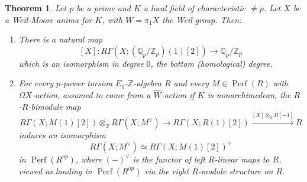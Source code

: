 \documentclass[12pt]{article}
\newtheorem{theorem}{Theorem}[section]
\theoremstyle{definition}
\newcommand{\on}{\operatorname}
\newcommand{\mbb}{\mathbb}
\newcommand{\wh}{\widehat}
\begin{document}
\begin{theorem}\label{localtate}
Let $p$ be a prime and $K$ a local field of characteristic $\neq p$.  Let $X$ be a Weil-Moore anima for $K$, with $W=\pi_1X$ the Weil group.  Then:
\begin{enumerate}
\item There is a natural map
$$[X]:R\Gamma(X;\left(\mbb{Q}_p/\mbb{Z}_p\right)(1)[2])\to \mbb{Q}_p/\mbb{Z}_p$$
which is an isomorphism in degree $0$, the bottom (homological) degree.
\item For every $p$-power torsion $E_1$-$\mbb{Z}$-algebra $R$ and every $M\in\on{Perf}(R)$ with $\Omega X$-action, assumed to come from a $\wh{W}$-action if $K$ is nonarchimedean, the $R$-$R$-bimodule map
$$R\Gamma(X;M(1)[2])\otimes_\mbb{Z} R\Gamma(X;M^\vee)\to R\Gamma(X;R(1)[2])\overset{[X]\otimes_{\mbb{Z}}R[-1]}{\longrightarrow} R$$
induces an isomorphism
$$R\Gamma(X;M^\vee)\simeq R\Gamma(X;M(1)[2])^\vee$$
in $\on{Perf}(R^{op})$, where $(-)^\vee$ is the functor of left $R$-linear maps to $R$, viewed as landing in $\on{Perf}(R^{op})$ via the right $R$-module structure on $R$.

\end{enumerate}
\end{theorem}
\end{document}
